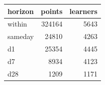 \begin{tabular}{lrr}
\toprule
horizon & points & learners \\
\midrule
within & 324164 & 5643 \\
sameday & 24810 & 4263 \\
d1 & 25354 & 4445 \\
d7 & 8934 & 4123 \\
d28 & 1209 & 1171 \\
\bottomrule
\end{tabular}

